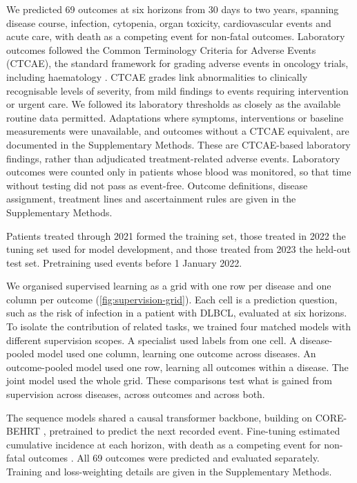 We predicted 69 outcomes at six horizons from 30 days to two years, spanning
disease course, infection, cytopenia, organ toxicity, cardiovascular events and
acute care, with death as a competing event for non-fatal outcomes. Laboratory outcomes followed the Common Terminology Criteria for Adverse
Events (CTCAE), the standard framework for grading adverse events in oncology
trials, including haematology \citep{nci2017ctcae,nci2025ctcae}. CTCAE grades
link abnormalities to clinically recognisable levels of severity, from mild
findings to events requiring intervention or urgent care. We followed its
laboratory thresholds as closely as the available routine data permitted.
Adaptations where symptoms, interventions or baseline measurements were
unavailable, and outcomes without a CTCAE equivalent, are documented in the
Supplementary Methods. These are CTCAE-based laboratory findings, rather than
adjudicated treatment-related adverse events.
Laboratory outcomes were counted
only in patients whose blood was monitored, so that time without testing
did not pass as event-free. Outcome definitions, disease assignment, treatment
lines and ascertainment rules are given in the Supplementary Methods.

Patients treated through 2021 formed the training set, those treated in 2022 the
tuning set used for model development, and those treated from 2023 the
held-out test set. Pretraining used events before 1 January 2022.

We organised supervised learning as a grid with one row per disease and one
column per outcome (\cref{fig:supervision-grid}). Each cell is a prediction
question, such as the risk of infection in a patient with DLBCL, evaluated at
six horizons. To isolate the contribution of related tasks, we trained four
matched models with different supervision scopes. A specialist used labels
from one cell. A disease-pooled model used one column, learning one outcome
across diseases. An outcome-pooled model used one row, learning all outcomes
within a disease. The joint model used the whole grid. These comparisons test what is
gained from supervision across diseases, across outcomes and across both.

The sequence models shared a causal transformer backbone, building on
CORE-BEHRT \citep{odgaard2024core}, pretrained to predict the next recorded
event. Fine-tuning estimated cumulative incidence at each horizon, with death
as a competing event for non-fatal outcomes
\citep{gensheimer2019nnetsurvival,lee2018deephit}. All 69 outcomes were predicted and evaluated separately. Training and
loss-weighting details are given in the Supplementary Methods.

